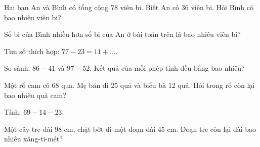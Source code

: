 \begin{ex}
Hai bạn An và Bình có tổng cộng 78 viên bi. Biết An có 36 viên bi. Hỏi Bình có bao nhiêu viên bi?
\end{ex}

\begin{ex}
Số bi của Bình nhiều hơn số bi của An ở bài toán trên là bao nhiêu viên bi?
\end{ex}

\begin{ex}
Tìm số thích hợp: $77 - 23 = 11 + \dots$.
\end{ex}

\begin{ex}
So sánh: $86 - 41$ và $97 - 52$. Kết quả của mỗi phép tính đều bằng bao nhiêu?
\end{ex}

\begin{ex}
Một rổ cam có 68 quả. Mẹ bán đi 25 quả và biếu bà 12 quả. Hỏi trong rổ còn lại bao nhiêu quả cam?
\end{ex}

\begin{ex}
Tính: $69 - 14 - 23$.
\end{ex}

\begin{ex}
Một cây tre dài 98 cm, chặt bớt đi một đoạn dài 45 cm. Đoạn tre còn lại dài bao nhiêu xăng-ti-mét?
\end{ex}
